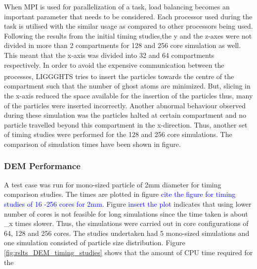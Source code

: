 \documentclass[preprint,11pt,authoryear]{elsarticle}
\begin{document}
		  \par When MPI is used for parallelization of a task, load balancing becomes an important parameter that needs to be considered. Each processor used during the task is utilised with the similar usage as compared to other processors being used. Following the results from the initial timing studies,the y and the z-axes were not divided in more than 2 compartments for 128 and 256 core simulation as well. This meant that the x-axis was divided into 32 and 64 compartments respectively. In order to avoid the expensive communication between the processes, LIGGGHTS\textsuperscript{\textregistered} tries to insert the particles towards the centre of the compartment such that the number of ghost atoms are minimized. But, slicing in the x-axis reduced the space available for the insertion of the particles thus, many of the particles were inserted incorrectly. Another abnormal behaviour observed during these simulation was the particles halted at certain compartment and no particle travelled beyond this compartment in the x-direction. Thus, another set of timing studies were performed for the 128 and 256 core simulations. The comparison of simulation times have been shown in figure.
		  
		  
	      
	    \subsubsection{DEM Performance}
	    \par A test case was run for mono-sized particle of 2mm diameter for timing comparison studies. The times are plotted in figure \textcolor{blue}{cite the figure for timing studies of 16 -256 cores for 2mm}. Figure \textcolor{blue}{insert the plot} indicates that using lower number of cores is not feasible for long simulations since the time taken is about \_x times slower. Thus, the simulations were carried out in core configurations of 64, 128 and 256 cores. The studies undertaken had 5 mono-sized simulations and one simulation consisted of particle size distribution. Figure \ref{fig:rslts_DEM_timing_studies} shows that the amount of CPU time required for the
	    
\end{document}
